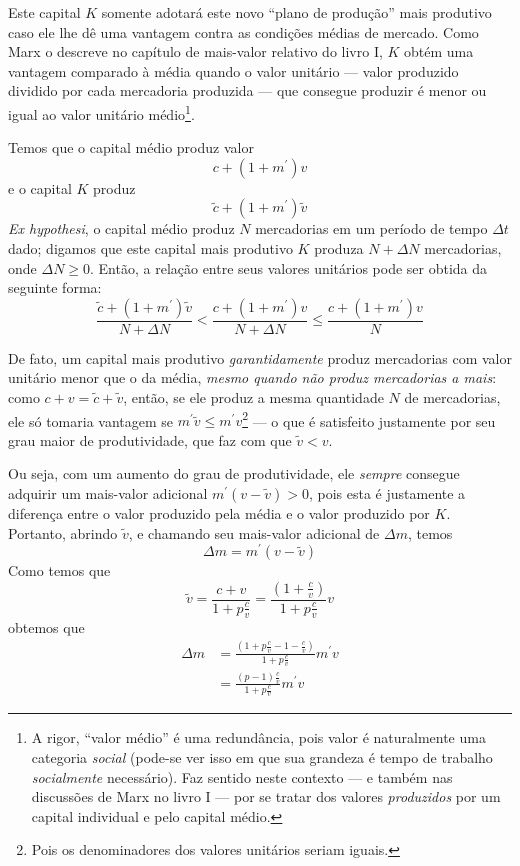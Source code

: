 \documentclass[12pt]{article}
\numberwithin{equation}{section}
\theoremstyle{plain}
\theoremstyle{definition}
\theoremstyle{remark}
\begin{document}
Este capital $K$ somente adotará este novo ``plano de produção'' mais produtivo caso ele lhe dê uma vantagem contra as condições médias de mercado. Como Marx o descreve no capítulo de mais-valor relativo do livro I, $K$ obtém uma vantagem comparado à média quando o valor unitário — valor produzido dividido por cada mercadoria produzida — que consegue produzir é menor ou igual ao valor unitário médio\footnote{A rigor, ``valor médio'' é uma redundância, pois valor é naturalmente uma categoria \textit{social} (pode-se ver isso em que sua grandeza é tempo de trabalho \textit{socialmente} necessário). Faz sentido neste contexto — e também nas discussões de Marx no livro I — por se tratar dos valores \textit{produzidos} por um capital individual e pelo capital médio.}. 

Temos que o capital médio produz valor
$$
c + (1+m^{\prime})v
$$
e o capital $K$ produz
$$
\tilde{c}+(1+m^{\prime})\tilde{v}
$$
\textit{Ex hypothesi}, o capital médio produz $N$ mercadorias em um período de tempo $\Delta t$ dado; digamos que este capital mais produtivo $K$ produza $N+\Delta N$ mercadorias, onde $\Delta N \geq 0$. Então, a relação entre seus valores unitários pode ser obtida da seguinte forma: 
$$
\frac{\tilde{c} + (1+m^{\prime})\tilde{v}}{N+\Delta N} < \frac{c+(1+m^{\prime})v}{N+\Delta N} \leq \frac{c+(1+m^{\prime})v}{N}
$$

De fato, um capital mais produtivo \textit{garantidamente} produz mercadorias com valor unitário menor que o da média, \textit{mesmo quando não produz mercadorias a mais}: como $c+v = \tilde{c}+\tilde{v}$, então, se ele produz a mesma quantidade $N$ de mercadorias, ele só tomaria vantagem se $m^{\prime}\tilde{v} \leq m^{\prime}v$\footnote{Pois os denominadores dos valores unitários seriam iguais.} — o que é satisfeito justamente por seu grau maior de produtividade, que faz com que $\tilde{v} < v$. 

Ou seja, com um aumento do grau de produtividade, ele \textit{sempre} consegue adquirir um mais-valor adicional $m^{\prime}(v-\tilde{v}) > 0$, pois esta é justamente a diferença entre o valor produzido pela média e o valor produzido por $K$. Portanto, abrindo $\tilde{v}$, e chamando seu mais-valor adicional de $\Delta m$, temos
$$
\Delta m = m^{\prime}(v-\tilde{v})
$$
Como temos que 
$$
\tilde{v} = \frac{c+v}{1+p \frac{c}{v}} = \frac{\left( 1+\frac{c}{v} \right)}{1+p \frac{c}{v}} v
$$
obtemos que
\begin{align*}
\Delta m &=\frac{\left( 1 + p \frac{c}{v} - 1 - \frac{c}{v} \right)}{1+p \frac{c}{v}} m^{\prime}v \\
&= \frac{(p-1) \frac{c}{v}}{1+ p \frac{c}{v}} m^{\prime}v
\end{align*}
\end{document}
